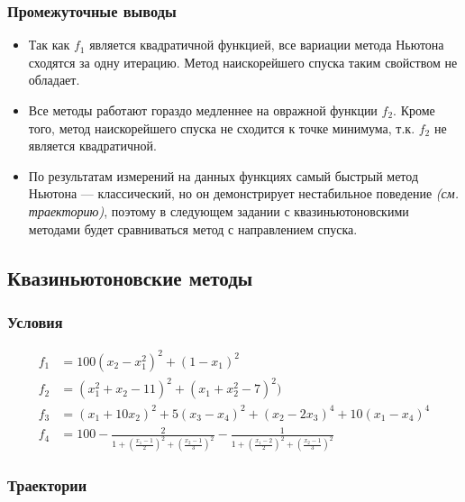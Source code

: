 \subsubsection{Промежуточные выводы}

\begin{itemize}
	\item Так как \(f_1\) является квадратичной функцией, все вариации метода Ньютона сходятся за одну итерацию. Метод наискорейшего спуска таким свойством не обладает.
	\item Все методы работают гораздо медленнее на овражной функции $f_2$. Кроме того, метод наискорейшего спуска не сходится к точке минимума, т.к. \(f_2\) не является квадратичной.
	\item По результатам измерений на данных функциях самый быстрый метод Ньютона --- классический, но он демонстрирует нестабильное поведение \textit{(см. траекторию)}, поэтому в следующем задании с квазиньютоновскими методами будет сравниваться метод с направлением спуска.
\end{itemize}

\subsection{Квазиньютоновские методы}

\subsubsection{Условия}

\begin{align*}
	f_1 & = 100(x_2 - x_1^2)^2 + (1 - x_1)^2                                                                                                                                            \\
	f_2 & = (x_1^2 + x_2 - 11)^2 + (x_1 + x_2^2 - 7)^2)                                                                                                                                 \\
	f_3 & = (x_1 + 10x_2)^2 + 5(x_3 - x_4)^2 + (x_2 - 2x_3)^4 + 10(x_1 - x_4)^4                                                                                                         \\
	f_4 & = 100 - \frac{2}{1 + \left(\frac{x_1 - 1}{2}\right)^2 + \left(\frac{x_2 - 1}{3}\right)^2} - \frac{1}{1 + \left(\frac{x_1 - 2}{2}\right)^2 + \left(\frac{x_2 - 1}{3}\right)^2}
\end{align*}

\subsubsection{Траектории}

